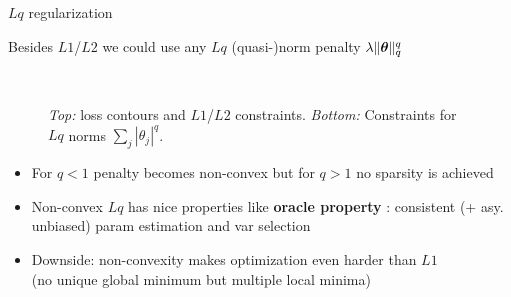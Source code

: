 \documentclass[11pt,compress,t,notes=noshow, xcolor=table]{beamer}
\begin{document}
\begin{vbframe}{$Lq$ regularization }

Besides $L1$/$L2$ we could use any $Lq$ (quasi-)norm penalty $\lambda \Vert \bm{\theta} \Vert_q^q$ 

\begin{figure}
  \\
\caption{{\scriptsize \textit{Top:} loss contours and $L1$/$L2$ constraints.
\textit{Bottom:} Constraints for $Lq$ norms $\sum_j |\theta_j|^q$.}}
\end{figure}
\vspace{-0.4cm}
{\footnotesize
\begin{itemize}
    \item For $q<1$ penalty becomes non-convex but for $q>1$ no sparsity is achieved
    \item Non-convex $Lq$ has nice properties like \textbf{oracle property} : consistent (+ asy. unbiased) param estimation and var selection
    \item Downside: non-convexity makes optimization even harder than $L1$\\
    (no unique global minimum but multiple local minima)
\end{itemize}
}
\end{vbframe}
\end{document}
